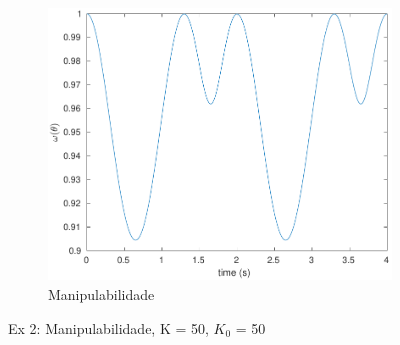 \documentclass[a4paper,11pt]{article}
\theoremstyle{mytheor}
\begin{document}
\begin{figure}[!ht]
\begin{minipage}{\linewidth}
    \begin{subfigure}[b]{0.49\textwidth}
    \includegraphics[width=1\textwidth]{figs/ex2_2a_manip.pdf}
    \caption{Manipulabilidade}
    \label{fig:ex2_2a_manip}
    \end{subfigure}
  \end{minipage}
\caption{Ex 2: Manipulabilidade, K = 50, $K_0$ = 50}
\label{fig:ex2_2a}
\end{figure}
\end{document}

